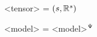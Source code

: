 \begin{minipage}{0.30\textwidth}
\begin{grammar}
<tensor> \realParam{} = $(s, \mathbb{R}^s)$
\end{grammar}
\end{minipage}
\hfill
\begin{minipage}{0.35\textwidth}
\begin{grammar}
<model> \realParam{} = <model>$^\Psi$
\end{grammar}
\end{minipage}